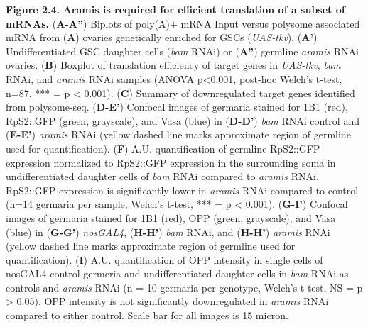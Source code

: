 \documentclass[12pt,twoside]{reedthesis}
\begin{document}
\textbf{Figure 2.4.} \textbf{Aramis is required for efficient translation of a subset
of mRNAs.} (\textbf{A-A''}) Biplots of poly(A)+ mRNA Input versus polysome
associated mRNA from (\textbf{A}) ovaries genetically enriched for GSCs
(\emph{UAS-tkv}), (\textbf{A'}) Undifferentiated GSC daughter cells (\emph{bam} RNAi)
or (\textbf{A''}) germline \emph{aramis} RNAi ovaries. (\textbf{B}) Boxplot of
translation efficiency of target genes in \emph{UAS-tkv}, \emph{bam} RNAi, and
\emph{aramis} RNAi samples (ANOVA p\textless0.001, post-hoc Welch's t-test, n=87,
*** = p \textless{} 0.001). (\textbf{C}) Summary of downregulated target genes
identified from polysome-seq. (\textbf{D-E'}) Confocal images of germaria
stained for 1B1 (red), RpS2::GFP (green, grayscale), and Vasa (blue) in
(\textbf{D-D'}) \emph{bam} RNAi control and (\textbf{E-E'}) \emph{aramis} RNAi (yellow
dashed line marks approximate region of germline used for
quantification). (\textbf{F}) A.U. quantification of germline RpS2::GFP
expression normalized to RpS2::GFP expression in the surrounding soma in
undifferentiated daughter cells of \emph{bam} RNAi compared to \emph{aramis} RNAi.
RpS2::GFP expression is significantly lower in \emph{aramis} RNAi compared to
control (n=14 germaria per sample, Welch's t-test, *** = p \textless{} 0.001).
(\textbf{G-I'}) Confocal images of germaria stained for 1B1 (red), OPP
(green, grayscale), and Vasa (blue) in (\textbf{G-G'}) \emph{nosGAL4}, (\textbf{H-H'})
\emph{bam} RNAi, and (\textbf{H-H'}) \emph{aramis} RNAi (yellow dashed line marks
approximate region of germline used for quantification). (\textbf{I}) A.U.
quantification of OPP intensity in single cells of nosGAL4 control
germeria and undifferentiated daughter cells in \emph{bam} RNAi as controls
and \emph{aramis} RNAi (n = 10 germaria per genotype, Welch's t-test, NS = p
\textgreater{} 0.05). OPP intensity is not significantly downregulated in \emph{aramis}
RNAi compared to either control. Scale bar for all images is 15 micron.
\end{document}

